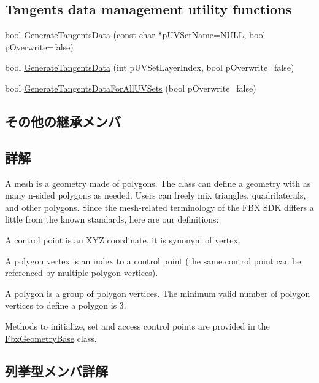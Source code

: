 \subsection*{Tangents data management utility functions}
\begin{DoxyCompactItemize}
\item 
bool \hyperlink{class_fbx_mesh_a7e8edf6f1cb66039f1a4aad23354a474}{Generate\+Tangents\+Data} (const char $\ast$p\+U\+V\+Set\+Name=\hyperlink{fbxarch_8h_a070d2ce7b6bb7e5c05602aa8c308d0c4}{N\+U\+LL}, bool p\+Overwrite=false)
\item 
bool \hyperlink{class_fbx_mesh_aca440ad11eb2fbeaa36cdeeff37e2551}{Generate\+Tangents\+Data} (int p\+U\+V\+Set\+Layer\+Index, bool p\+Overwrite=false)
\item 
bool \hyperlink{class_fbx_mesh_a0939d342aa2c0420c755dc1aa2594363}{Generate\+Tangents\+Data\+For\+All\+U\+V\+Sets} (bool p\+Overwrite=false)
\end{DoxyCompactItemize}
\subsection*{その他の継承メンバ}


\subsection{詳解}
A mesh is a geometry made of polygons. The class can define a geometry with as many n-\/sided polygons as needed. Users can freely mix triangles, quadrilaterals, and other polygons. Since the mesh-\/related terminology of the F\+BX S\+DK differs a little from the known standards, here are our definitions\+: \begin{DoxyItemize}
\item A control point is an X\+YZ coordinate, it is synonym of vertex. \item A polygon vertex is an index to a control point (the same control point can be referenced by multiple polygon vertices). \item A polygon is a group of polygon vertices. The minimum valid number of polygon vertices to define a polygon is 3.\end{DoxyItemize}
Methods to initialize, set and access control points are provided in the \hyperlink{class_fbx_geometry_base}{Fbx\+Geometry\+Base} class. 

\subsection{列挙型メンバ詳解}
\mbox{\label{class_fbx_mesh_ab9e7d41ffcd49467a374c72e0d6f3561}} 
